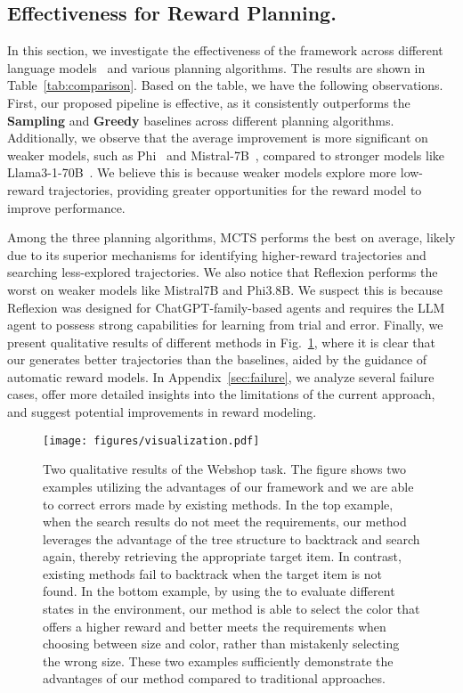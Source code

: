 \subsection{Effectiveness for Reward Planning.}
\label{exp:effect}
In this section, we investigate the effectiveness of the framework across different language models~\citep{dubey2024llama3herdmodels,jiang2023mistral7b,abdin2024phi3technicalreporthighly} and various planning algorithms. The results are shown in Table~\ref{tab:comparison}. Based on the table, we have the following observations. First, our proposed pipeline is effective, as it consistently outperforms the \textbf{Sampling} and \textbf{Greedy} baselines across different planning algorithms. Additionally, we observe that the average improvement is more significant on weaker models, such as Phi~\citep{abdin2024phi3technicalreporthighly} and Mistral-7B~\citep{jiang2023mistral7b}, compared to stronger models like Llama3-1-70B~\citep{dubey2024llama3herdmodels}. We believe this is because weaker models explore more low-reward trajectories, providing greater opportunities for the reward model to improve performance.

Among the three planning algorithms, MCTS performs the best on average, likely due to its superior mechanisms for identifying higher-reward trajectories and searching less-explored trajectories. We also notice that Reflexion performs the worst on weaker models like Mistral7B and Phi3.8B. We suspect this is because Reflexion was designed for ChatGPT-family-based agents and requires the LLM agent to possess strong capabilities for learning from trial and error.
Finally, we present qualitative results of different methods in Fig.~\ref{fig:vis_webshop}, where it is clear that our \Model generates better trajectories than the baselines, aided by the guidance of automatic reward models.
In Appendix~\ref{sec:failure}, 
we analyze several failure cases, offer more detailed insights into the limitations of the current approach, and suggest potential improvements in reward modeling.


\begin{figure}[t]  
   \centering
   \texttt{[image: figures/visualization.pdf]}  
   \caption{Two qualitative results of the Webshop task. The figure shows two examples utilizing the advantages of our \Model framework and we are able to correct errors made by existing methods. In the top example, when the search results do not meet the requirements, our \Model method leverages the advantage of the tree structure to backtrack and search again, thereby retrieving the appropriate target item. In contrast, existing methods fail to backtrack when the target item is not found. In the bottom example, by using the \Model to evaluate different states in the environment, our method is able to select the color that offers a higher reward and better meets the requirements when choosing between size and color, rather than mistakenly selecting the wrong size. These two examples sufficiently demonstrate the advantages of our method compared to traditional approaches.}
   \label{fig:vis_webshop}  
\end{figure}

